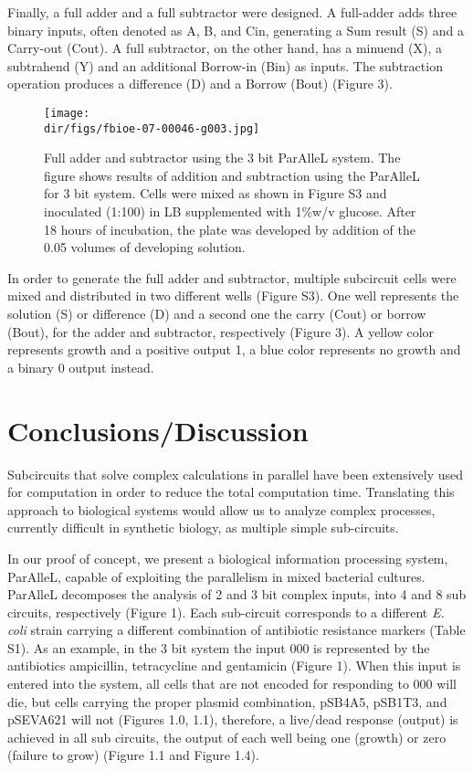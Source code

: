 Finally, a full adder and a full subtractor were designed. A full-adder adds three binary inputs, often denoted as A, B, and Cin, generating a Sum result (S) and a Carry-out (Cout). A full subtractor, on the other hand, has a minuend (X), a subtrahend (Y) and an additional Borrow-in (Bin) as inputs. The subtraction operation produces a difference (D) and a Borrow (Bout) (Figure 3).
\begin{figure}[htbp]
  \centering
  \texttt{[image: \\dir/figs/fbioe-07-00046-g003.jpg]}
  \caption{Full adder and subtractor using the 3 bit ParAlleL system. The figure shows results of addition and subtraction using the ParAlleL for 3 bit system. Cells were mixed as shown in Figure S3 and inoculated (1:100) in LB supplemented with 1\%w/v glucose. After 18 hours of incubation, the plate was developed by addition of the 0.05 volumes of developing solution.}
  \label{fig.example}
\end{figure}
In order to generate the full adder and subtractor, multiple subcircuit cells were mixed and distributed in two different wells (Figure S3). One well represents the solution (S) or difference (D) and a second one the carry (Cout) or borrow (Bout), for the adder and subtractor, respectively (Figure 3). A yellow color represents growth and a positive output 1, a blue color represents no growth and a binary 0 output instead.

\section{\textbf{Conclusions/Discussion}}

Subcircuits that solve complex calculations in parallel have been extensively used for computation in order to reduce the total computation time. Translating this approach to biological systems would allow us to analyze complex processes, currently difficult in synthetic biology, as multiple simple sub-circuits.

In our proof of concept, we present a biological information processing system, ParAlleL, capable of exploiting the parallelism in mixed bacterial cultures. ParAlleL decomposes the analysis of 2 and 3 bit complex inputs, into 4 and 8 sub circuits, respectively (Figure 1). Each sub-circuit corresponds to a different \textit{E. coli} strain carrying a different combination of antibiotic resistance markers (Table S1). As an example, in the 3 bit system the input 000 is represented by the antibiotics ampicillin, tetracycline and gentamicin (Figure 1). When this input is entered into the system, all cells that are not encoded for responding to 000 will die, but cells carrying the proper plasmid combination, pSB4A5, pSB1T3, and pSEVA621 will not (Figures 1.0, 1.1), therefore, a live/dead response (output) is achieved in all sub circuits, the output of each well being one (growth) or zero (failure to grow) (Figure 1.1 and Figure 1.4).


